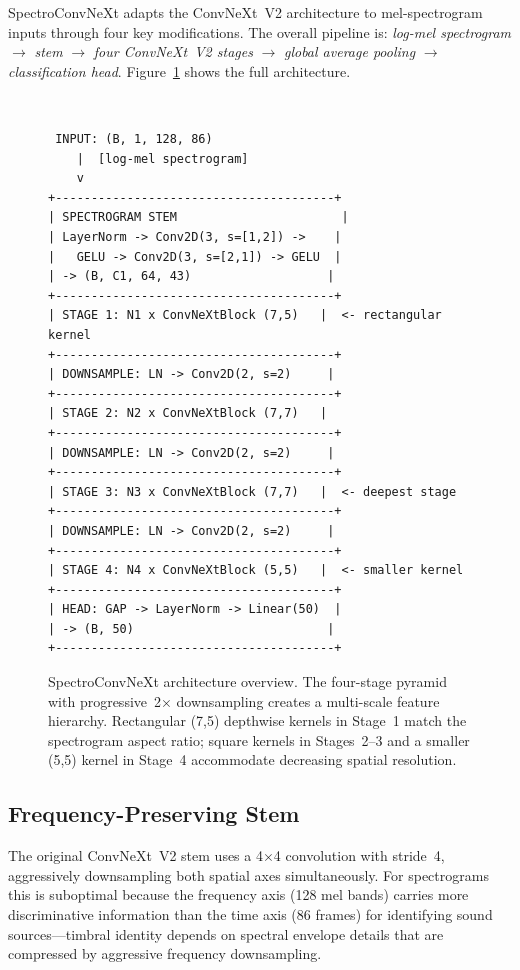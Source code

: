 \documentclass{article}
\begin{document}
SpectroConvNeXt adapts the ConvNeXt~V2 architecture to mel-spectrogram inputs
through four key modifications. The overall pipeline is: \emph{log-mel
spectrogram} $\rightarrow$ \emph{stem} $\rightarrow$ \emph{four ConvNeXt~V2
stages} $\rightarrow$ \emph{global average pooling} $\rightarrow$
\emph{classification head}. Figure~\ref{fig:arch} shows the full architecture.

\begin{figure}[h]
  \centering
  \begin{minipage}{0.92\linewidth}
  \small\tt
  \begin{verbatim}
 INPUT: (B, 1, 128, 86)
    |  [log-mel spectrogram]
    v
+---------------------------------------+
| SPECTROGRAM STEM                       |
| LayerNorm -> Conv2D(3, s=[1,2]) ->    |
|   GELU -> Conv2D(3, s=[2,1]) -> GELU  |
| -> (B, C1, 64, 43)                   |
+---------------------------------------+
| STAGE 1: N1 x ConvNeXtBlock (7,5)   |  <- rectangular kernel
+---------------------------------------+
| DOWNSAMPLE: LN -> Conv2D(2, s=2)     |
+---------------------------------------+
| STAGE 2: N2 x ConvNeXtBlock (7,7)   |
+---------------------------------------+
| DOWNSAMPLE: LN -> Conv2D(2, s=2)     |
+---------------------------------------+
| STAGE 3: N3 x ConvNeXtBlock (7,7)   |  <- deepest stage
+---------------------------------------+
| DOWNSAMPLE: LN -> Conv2D(2, s=2)     |
+---------------------------------------+
| STAGE 4: N4 x ConvNeXtBlock (5,5)   |  <- smaller kernel
+---------------------------------------+
| HEAD: GAP -> LayerNorm -> Linear(50)  |
| -> (B, 50)                           |
+---------------------------------------+
  \end{verbatim}
  \end{minipage}
  \caption{SpectroConvNeXt architecture overview. The four-stage pyramid with
  progressive~2$\times$ downsampling creates a multi-scale feature hierarchy.
  Rectangular (7,5) depthwise kernels in Stage~1 match the spectrogram aspect
  ratio; square kernels in Stages~2--3 and a smaller (5,5) kernel in Stage~4
  accommodate decreasing spatial resolution.}
  \label{fig:arch}
\end{figure}

\subsection{Frequency-Preserving Stem}

The original ConvNeXt~V2 stem uses a 4$\times$4 convolution with stride~4,
aggressively downsampling both spatial axes simultaneously. For spectrograms
this is suboptimal because the frequency axis (128 mel bands) carries more
discriminative information than the time axis (86 frames) for identifying sound
sources---timbral identity depends on spectral envelope details that are
compressed by aggressive frequency downsampling.
\end{document}
